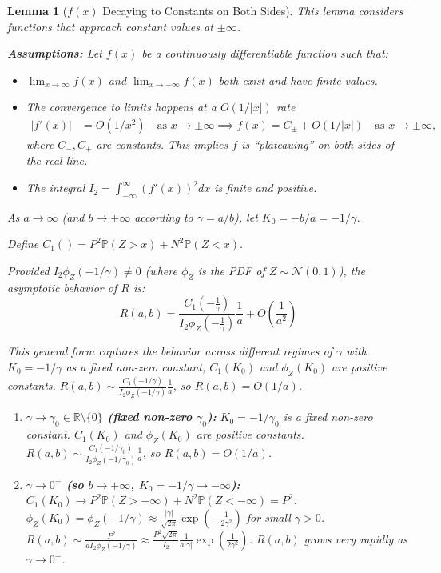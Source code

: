 \documentclass[11pt]{article}
\newtheorem{lemma}{Lemma}
\begin{document}
\begin{lemma}[$f(x)$ Decaying to Constants on Both Sides]
This lemma considers functions that approach constant values at $\pm\infty$.

\textbf{Assumptions:}
Let $f(x)$ be a continuously differentiable function such that:
\begin{itemize}
    \item[\textbf{(A1)}] $\lim_{x\to\infty} f(x)$ and $\lim_{x\to-\infty} f(x) $ both exist and have finite values. 
    \item[\textbf{(A2)}] The convergence to limits happens at a $O(1/|x|)$ rate
    \begin{align}
    |f'(x)| &= O(1/x^2) \quad \text{as } x \to \pm\infty  \implies  f(x) = C_\pm + O(1/|x|) \quad \text{as } x \to \pm\infty,
    \end{align}
    where $C_-, C_+$ are constants. This implies $f$ is ``plateauing'' on both sides of the real line. 
    
    \item[\textbf{(A3)}] The integral $I_2 = \int_{-\infty}^{\infty} (f'(x))^2 dx$ is finite and positive.
\end{itemize}

As $a \to \infty$ (and $b \to \pm\infty$ according to $\gamma = a/b$), let $K_0 = -b/a = -1/\gamma$.

Define $C_1() = P^2 \mathbb{P}(Z > x) + N^2 \mathbb{P}(Z < x).$

Provided $I_2 \phi_Z(-1/\gamma) \neq 0$ (where $\phi_Z$ is the PDF of $Z \sim \mathcal{N}(0,1)$), the asymptotic behavior of $R$ is:
$$R(a,b) = \frac{C_1(-\frac1\gamma)}{I_2 \phi_Z(-\frac1\gamma)} \frac{1}{a} + O\left(\frac{1}{a^2}\right)$$

This general form captures the behavior across different regimes of $\gamma$ with 
    $K_0 = -1/\gamma$ as a fixed non-zero constant, $C_1(K_0)$ and $\phi_Z(K_0)$ are positive constants.
    $R(a,b) \sim \frac{C_1(-1/\gamma)}{I_2 \phi_Z(-1/\gamma)} \frac{1}{a}$, so $R(a,b) = O(1/a)$.

\begin{enumerate}
    \item \textbf{$\gamma \to \gamma_0 \in \mathbb{R} \setminus \{0\}$ (fixed non-zero $\gamma_0$):}
    $K_0 = -1/\gamma_0$ is a fixed non-zero constant. $C_1(K_0)$ and $\phi_Z(K_0)$ are positive constants.
    $R(a,b) \sim \frac{C_1(-1/\gamma_0)}{I_2 \phi_Z(-1/\gamma_0)} \frac{1}{a}$, so $R(a,b) = O(1/a)$.

    \item \textbf{$\gamma \to 0^+$ (so $b \to +\infty$, $K_0 = -1/\gamma \to -\infty$):}
    $C_1(K_0) \to P^2 \mathbb{P}(Z > -\infty) + N^2 \mathbb{P}(Z < -\infty) = P^2$.
    $\phi_Z(K_0) = \phi_Z(-1/\gamma) \approx \frac{|\gamma|}{\sqrt{2\pi}} \exp\left(-\frac{1}{2\gamma^2}\right)$ for small $\gamma > 0$.
    $R(a,b) \sim \frac{P^2}{a I_2 \phi_Z(-1/\gamma)} \approx \frac{P^2 \sqrt{2\pi}}{I_2} \frac{1}{a|\gamma|} \exp\left(\frac{1}{2\gamma^2}\right)$.
    $R(a,b)$ grows very rapidly as $\gamma \to 0^+$.


\end{enumerate}
\end{lemma}
\end{document}
